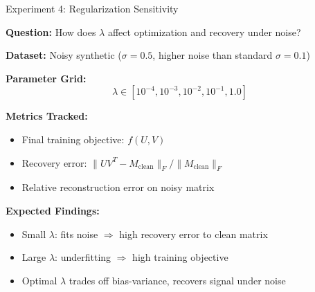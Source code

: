 \documentclass[aspectratio=169,usenames,dvipsnames]{beamer}
\begin{document}
\begin{frame}{Experiment 4: Regularization Sensitivity}

\textbf{Question:} How does $\lambda$ affect optimization and recovery under noise?

\vspace{0.3cm}

\textbf{Dataset:} Noisy synthetic ($\sigma = 0.5$, higher noise than standard $\sigma = 0.1$)

\vspace{0.3cm}

\textbf{Parameter Grid:}
\[
\lambda \in [10^{-4}, 10^{-3}, 10^{-2}, 10^{-1}, 1.0]
\]

\vspace{0.3cm}

\textbf{Metrics Tracked:}
\begin{itemize}
  \item Final training objective: $f(U, V)$
  \item Recovery error: $\|UV^T - M_{\text{clean}}\|_F / \|M_{\text{clean}}\|_F$
  \item Relative reconstruction error on noisy matrix
\end{itemize}

\vspace{0.3cm}

\textbf{Expected Findings:}
\begin{itemize}
  \item Small $\lambda$: fits noise $\Rightarrow$ high recovery error to clean matrix
  \item Large $\lambda$: underfitting $\Rightarrow$ high training objective
  \item Optimal $\lambda$ trades off bias-variance, recovers signal under noise
\end{itemize}

\end{frame}
\end{document}
